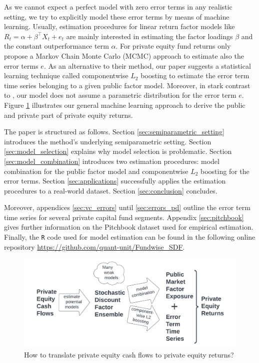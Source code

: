 \documentclass[12pt]{article}
\begin{document}
As we cannot expect a perfect model with zero error terms in any realistic setting, we try to explicitly model these error terms by means of machine learning.
Usually, estimation procedures for linear return factor models like $R_t= \alpha + \beta^{\top} X_t + e_t$ are mainly interested in estimating the factor loadings $\beta$ and the constant outperformance term $\alpha$.
For private equity fund returns only \cite{ACGP18} propose a Markov Chain Monte Carlo (MCMC) approach to estimate also the error terms $e$.
As an alternative to their method, our paper suggests a statistical learning technique called componentwise $L_2$ boosting to estimate the error term time series belonging to a given public factor model.
Moreover, in stark contrast to \cite{ACGP18}, our model does not assume a parametric distribution for the error term $e$.
Figure \ref{fig:how} illustrates our general machine learning approach to derive the public and private part of private equity returns.

The paper is structured as follows.
Section \ref{sec:semiparametric_setting} introduces the method's underlying semiparametric setting.
Section \ref{sec:model_selection} explains why model selection is problematic.
Section \ref{sec:model_combination} introduces two estimation procedures: model combination for the public factor model and componentwise $L_2$ boosting for the error terms.
Section \ref{sec:applications} successfully applies the estimation procedures to a real-world dataset.
Section \ref{sec:conclusion} concludes.

Moreover, appendices \ref{sec:vc_errors} until \ref{sec:errors_pd} outline the error term time series for several private capital fund segments. 
Appendix \ref{sec:pitchbook} gives further information on the Pitchbook dataset used for empirical estimation.
Finally, the \texttt{R} code used for model estimation can be found in the following online repository \url{https://github.com/quant-unit/Fundwise_SDF}.

\begin{figure}[ht]
	\centering
	\includegraphics[width=14cm]{FlowChart/MLPER}
	\caption{How to translate private equity cash flows to private equity returns?}
	\label{fig:how}
\end{figure}
\end{document}
